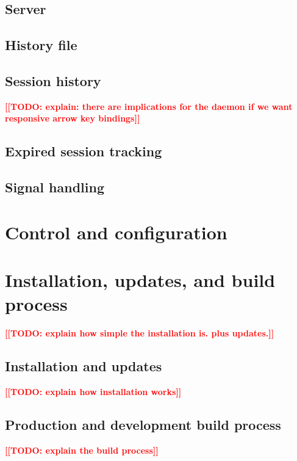 \documentclass[thesis=M,english]{FITthesis}[2012/10/20]
\newcommand{\todotext}[1]{\textcolor{red}{\textbf{[[#1]]}}}
\newcommand{\blind}[1][1]{\textcolor{mygray}{\Blindtext[#1][1]}}
\begin{document}
\subsection{Server}

\subsection{History file}

\subsection{Session history}
\todotext{TODO: explain: there are implications for the daemon if we want responsive arrow key bindings}

\subsection{Expired session tracking}


\subsection{Signal handling}

\blind

\section{Control and configuration}

\blind

\section{Installation, updates, and build process}

\todotext{TODO: explain how simple the installation is. plus updates.}

\blind

\subsection{Installation and updates}
\todotext{TODO: explain how installation works}

\blind

\subsection{Production and development build process}
\todotext{TODO: explain the build process}
\end{document}
